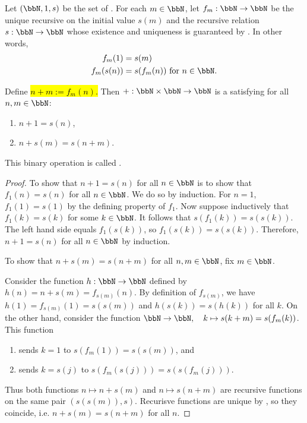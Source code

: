 \begin{proposition} \label{proposition:natural_numbers_addition_existence}
Let $(\bbN, 1, s)$ be the set of . For each $m \in \bbN$, let $f_m: \bbN \to \bbN$ be the unique recursive  on the initial value $s(m)$ and the recursive relation $s: \bbN \to \bbN$ whose existence and uniqueness is guaranteed by . In other words,
\begin{align*}
f_m(1) &= s(m) \\
f_m(s(n)) &= s(f_m(n)) \text{ for } n \in \bbN.
\end{align*}

Define
\hl{$n + m := f_m(n)$.}
Then $+: \bbN \times \bbN \to \bbN$ is a  satisfying for all $n, m \in \bbN$:
\begin{enumerate}
    \item $n + 1 = s(n)$,
    \item $n + s(m) = s(n + m)$.
\end{enumerate}
This binary operation is called .
\end{proposition}

\begin{proof}
To show that $n+1 = s(n)$ for all $n \in \bbN$ is to show that $f_1(n) = s(n)$ for all $n \in \bbN$. We do so by induction. For $n = 1$, $f_1(1) = s(1)$ by the defining property of $f_1$. Now suppose inductively that $f_1(k) = s(k)$ for some $k \in \bbN$. It follows that $s(f_1(k)) = s(s(k))$. The left hand side equals $f_1(s(k))$, so $f_1(s(k)) = s(s(k))$. Therefore, $n+1 = s(n)$ for all $n \in \bbN$ by induction.

To show that $n+s(m) = s(n+m)$ for all $n,m \in \bbN$, fix $m \in \bbN$. 

Consider the function $h: \bbN \to \bbN$ defined by $h(n) = n + s(m) = f_{s(m)}(n)$. By definition of $f_{s(m)}$, we have $h(1) = f_{s(m)}(1) = s(s(m))$ and $h(s(k)) = s(h(k))$ for all $k$. On the other hand, consider the function $\bbN \to \bbN, \quad k \mapsto s(k + m) = s(f_m(k))$. This function 
\begin{enumerate}
    \item sends $k = 1$ to $s(f_m(1)) = s(s(m))$, and 
    \item sends $k = s(j)$ to $s(f_{m}(s(j))) = s(s(f_m(j)))$.
\end{enumerate}
 Thus both functions $n \mapsto n + s(m)$ and $n \mapsto s(n + m)$ are recursive functions on the same pair $(s(s(m)), s)$. Recurisve functions are unique by , so they coincide, i.e. $n + s(m) = s(n + m)$ for all $n$.
\end{proof}
